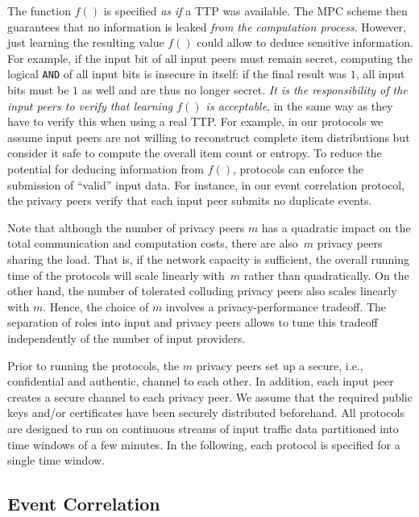 \documentclass[letterpaper,11pt,onecolumn,titlepage]{article}
\begin{document}
The function $f()$ is specified \emph{as if} a TTP was available. The MPC scheme then guarantees that
no information is leaked \emph{from the computation process}. However, just learning the resulting value 
$f()$ could allow to deduce sensitive information.
For example, if the input bit of all input peers must remain secret, computing the logical \texttt{AND} of all
input bits is insecure in itself: if the final result was $1$, all input bits must be $1$ as well and are thus no longer secret.
\emph{It is the responsibility of the input peers to verify that learning $f()$ is acceptable}, 
in the same way as they have to verify this when using a real TTP.
For example, in our protocols we assume input peers are not willing to reconstruct complete item distributions but consider it
safe to compute the overall item count or entropy.
To reduce the potential for deducing information from $f()$, protocols can enforce the submission of ``valid'' input data.
For instance, in our event correlation protocol, the privacy peers verify that each input peer submits no duplicate events. 

Note that although the number of privacy peers $m$ has a quadratic
impact on the total communication and computation costs, there are also~$m$ privacy
peers sharing the load. That is, if the network capacity is sufficient, the overall running time of the
protocols will scale linearly with~$m$ rather than quadratically.
On the other hand, the number of tolerated colluding privacy peers
also scales linearly with $m$. Hence, the choice of $m$ involves a privacy-performance tradeoff. The separation of
roles into input and privacy peers allows to tune this tradeoff independently of the number of input providers.

Prior to running the protocols, the $m$ privacy peers set up a secure,
i.e., confidential and authentic, channel to each other. In
addition, each input peer creates a secure channel to each
privacy peer. We assume that the required public keys and/or
certificates have been securely distributed beforehand. 
All protocols are designed to run on continuous streams of input traffic data partitioned into time windows of a few minutes. In the following,
each protocol is specified for a single time window.


\subsection{Event Correlation}
\label{sec:ec}
\end{document}
